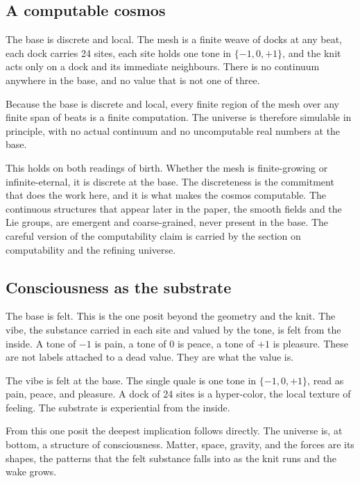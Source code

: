 \subsection{A computable cosmos}

The base is discrete and local. The mesh is a finite weave of docks at any beat, each dock carries 24 sites, each site holds one tone in $\{-1, 0, +1\}$, and the knit acts only on a dock and its immediate neighbours. There is no continuum anywhere in the base, and no value that is not one of three.

\begin{theorem}
Because the base is discrete and local, every finite region of the mesh over any finite span of beats is a finite computation. The universe is therefore simulable in principle, with no actual continuum and no uncomputable real numbers at the base.
\end{theorem}

This holds on both readings of birth. Whether the mesh is finite-growing or infinite-eternal, it is discrete at the base. The discreteness is the commitment that does the work here, and it is what makes the cosmos computable. The continuous structures that appear later in the paper, the smooth fields and the Lie groups, are emergent and coarse-grained, never present in the base. The careful version of the computability claim is carried by the section on computability and the refining universe.

\subsection{Consciousness as the substrate}

The base is felt. This is the one posit beyond the geometry and the knit. The vibe, the substance carried in each site and valued by the tone, is felt from the inside. A tone of $-1$ is pain, a tone of $0$ is peace, a tone of $+1$ is pleasure. These are not labels attached to a dead value. They are what the value is.

\begin{axiom}
The vibe is felt at the base. The single quale is one tone in $\{-1, 0, +1\}$, read as pain, peace, and pleasure. A dock of 24 sites is a hyper-color, the local texture of feeling. The substrate is experiential from the inside.
\end{axiom}

From this one posit the deepest implication follows directly. The universe is, at bottom, a structure of consciousness. Matter, space, gravity, and the forces are its shapes, the patterns that the felt substance falls into as the knit runs and the wake grows.

